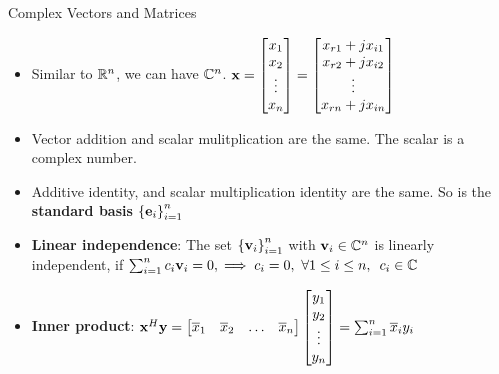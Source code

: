 \documentclass[aspectratio=169]{beamer}
\let\olditem\item
\renewcommand{\item}{\setlength{\itemsep}{\fill}\olditem}
\def\mf{\ensuremath\mathbf}
\def\mb{\ensuremath\mathbb}
\begin{document}
\begin{frame}[t]{Complex Vectors and Matrices}
\begin{itemize}
    \item Similar to $\mb{R}^n$, we can have $\mb{C}^n$. $\mf{x} = \begin{bmatrix*}x_{1}\\x_{2}\\\vdots\\x_{n}\end{bmatrix*} = \begin{bmatrix*}x_{r1} + jx_{i1}\\x_{r2} + jx_{i2}\\\vdots\\x_{rn} + jx_{in}\end{bmatrix*}$
    
    \item Vector addition and scalar mulitplication are the same. The scalar is a complex number.
    
    \item Additive identity, and scalar multiplication identity are the same. So is the \textbf{standard basis} $\left\{\mf{e}_i\right\}_{i=1}^{n}$
    
    \item \textbf{Linear independence}: The set $\left\{\mf{v}_i\right\}_{i=1}^n$ with $\mf{v}_i \in \mb{C}^n$ is linearly independent, if  $\sum_{i=1}^nc_i\mf{v}_i = 0, \implies c_i = 0, \,\, \forall 1 \leq i \leq n, \,\,\, c_i \in \mb{C}$
    
    \item \textbf{Inner product}: $\mf{x}^H\mf{y} = \begin{bmatrix*}\overline{x}_1&\overline{x}_2&\ldots&\overline{x}_n\end{bmatrix*}\begin{bmatrix*}y_1\\y_2\\\vdots\\y_n\end{bmatrix*} = \sum_{i=1}^n\overline{x}_iy_i$

\end{itemize}
\end{frame}
\end{document}
